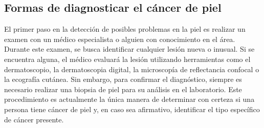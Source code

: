\subsection{Formas de diagnosticar el cáncer de piel}
El primer paso en la detección de posibles problemas en la piel es realizar un examen con un médico especialista o alguien con conocimiento en el área. Durante este examen, se busca identificar cualquier lesión nueva o inusual. Si se encuentra alguna, el médico evaluará la lesión utilizando herramientas como el dermatoscopio, la dermatoscopia digital, la microscopía de reflectancia confocal o la ecografía cutánea. Sin embargo, para confirmar el diagnóstico, siempre es necesario realizar una biopsia de piel para su análisis en el laboratorio. Este procedimiento es actualmente la única manera de determinar con certeza si una persona tiene cáncer de piel y, en caso sea afirmativo, identificar el tipo específico de cáncer presente. \parencite{clinica_barcelona}


